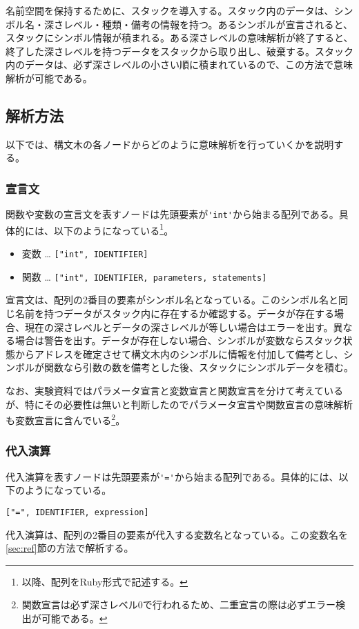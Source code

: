 \documentclass[titlepage, a4paper,12pt]{jarticle}
\begin{document}
名前空間を保持するために、スタックを導入する。スタック内のデータは、シンボル名・深さレベル・種類・備考の情報を持つ。あるシンボルが宣言されると、スタックにシンボル情報が積まれる。ある深さレベルの意味解析が終了すると、終了した深さレベルを持つデータをスタックから取り出し、破棄する。スタック内のデータは、必ず深さレベルの小さい順に積まれているので、この方法で意味解析が可能である。
\subsection{解析方法}
以下では、構文木の各ノードからどのように意味解析を行っていくかを説明する。
\subsubsection{宣言文}
関数や変数の宣言文を表すノードは先頭要素が\verb|'int'|から始まる配列である。具体的には、以下のようになっている\footnote{以降、配列をRuby形式で記述する。}。
\begin{itemize}
\item 変数 … \verb|["int", IDENTIFIER]|
\item 関数 … \verb|["int", IDENTIFIER, parameters, statements]|
\end{itemize}
宣言文は、配列の2番目の要素がシンボル名となっている。このシンボル名と同じ名前を持つデータがスタック内に存在するか確認する。データが存在する場合、現在の深さレベルとデータの深さレベルが等しい場合はエラーを出す。異なる場合は警告を出す。データが存在しない場合、シンボルが変数ならスタック状態からアドレスを確定させて構文木内のシンボルに情報を付加して備考とし、シンボルが関数なら引数の数を備考とした後、スタックにシンボルデータを積む。

なお、実験資料ではパラメータ宣言と変数宣言と関数宣言を分けて考えているが、特にその必要性は無いと判断したのでパラメータ宣言や関数宣言の意味解析も変数宣言に含んでいる\footnote{関数宣言は必ず深さレベル0で行われるため、二重宣言の際は必ずエラー検出が可能である。}。
\subsubsection{代入演算}
代入演算を表すノードは先頭要素が\verb|'='|から始まる配列である。具体的には、以下のようになっている。
\begin{verbatim}
["=", IDENTIFIER, expression]
\end{verbatim}
代入演算は、配列の2番目の要素が代入する変数名となっている。この変数名を\ref{sec:ref}節の方法で解析する。
\end{document}
